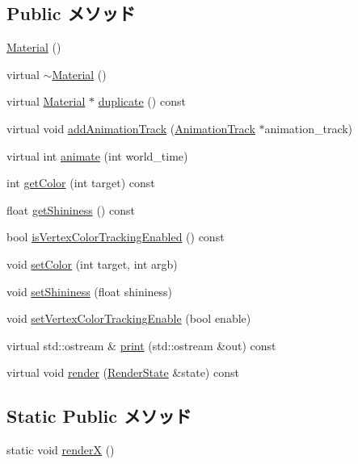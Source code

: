 \subsection*{Public メソッド}
\begin{CompactItemize}
\item 
\hyperlink{classm3g_1_1Material_ade2019060d01e7983e9bc40ea6aa404}{Material} ()
\item 
virtual \hyperlink{classm3g_1_1Material_b15b7efa255e5cca9b02a031a783cfe8}{$\sim$Material} ()
\item 
virtual \hyperlink{classm3g_1_1Material}{Material} $\ast$ \hyperlink{classm3g_1_1Material_1bdbc2f934efac291bf7d8f49ba10dda}{duplicate} () const 
\item 
virtual void \hyperlink{classm3g_1_1Material_415c0b110f95410ded9b85e5d99a496b}{addAnimationTrack} (\hyperlink{classm3g_1_1AnimationTrack}{AnimationTrack} $\ast$animation\_\-track)
\item 
virtual int \hyperlink{classm3g_1_1Material_8aad1ceab4c2a03609c8a42324ce484d}{animate} (int world\_\-time)
\item 
int \hyperlink{classm3g_1_1Material_d5740043584c6bf87bf014402c5985be}{getColor} (int target) const 
\item 
float \hyperlink{classm3g_1_1Material_1bab082fe3510dbe7b98dd07b3976b5b}{getShininess} () const 
\item 
bool \hyperlink{classm3g_1_1Material_64fb5d60325fd073ab623d0eb04189d1}{isVertexColorTrackingEnabled} () const 
\item 
void \hyperlink{classm3g_1_1Material_5947a525a18bca77aa890971df2ae48a}{setColor} (int target, int argb)
\item 
void \hyperlink{classm3g_1_1Material_fb630e98bef48acb3b3c0541ed3615be}{setShininess} (float shininess)
\item 
void \hyperlink{classm3g_1_1Material_55778ceeb6408e5db698c793dea1edd6}{setVertexColorTrackingEnable} (bool enable)
\item 
virtual std::ostream \& \hyperlink{classm3g_1_1Material_6fea17fa1532df3794f8cb39cb4f911f}{print} (std::ostream \&out) const 
\item 
virtual void \hyperlink{classm3g_1_1Material_8babc8a79b78615da51161e94029eea9}{render} (\hyperlink{structm3g_1_1RenderState}{RenderState} \&state) const 
\end{CompactItemize}
\subsection*{Static Public メソッド}
\begin{CompactItemize}
\item 
static void \hyperlink{classm3g_1_1Material_443a7a301f77f625335ecc06d13bad06}{renderX} ()
\end{CompactItemize}
